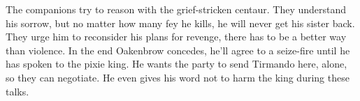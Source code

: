 The companions try to reason with the grief-stricken centaur. They understand his sorrow, but no matter how many fey he kills, he will never get his sister back. They urge him to reconsider his plans for revenge, there has to be a better way than violence. In the end Oakenbrow concedes, he'll agree to a seize-fire until he has spoken to the pixie king. He wants the party to send Tirmando here, alone, so they can negotiate. He even gives his word not to harm the king during these talks.\\

